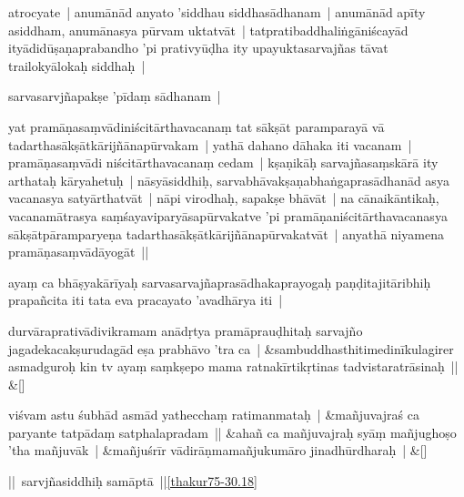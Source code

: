 \documentclass[article,12pt,a4paper]{memoir}%
\newcounter{parCount}
\begin{document}
	  \pstart \leavevmode%
	\label{thakur75-31.9}atrocyate | anumānād anyato 'siddhau siddhasādhanam | anumānād apīty asiddham, anumānasya pūrvam uktatvāt | tatpratibaddhaliṅgāniścayād ityādidūṣaṇaprabandho 'pi prativyūḍha ity upayuktasarvajñas tāvat trailokyālokaḥ siddhaḥ | 
	{}
	\pend%
      

	  \pstart \leavevmode%
	sarvasarvjñapakṣe 'pīdaṃ sādhanam | 
	{}
	\pend%
      

	  \pstart \leavevmode%
	yat pramāṇasaṃvādiniścitārthavacanaṃ tat sākṣāt paramparayā vā tadarthasākṣātkārijñānapūrvakam | yathā dahano dāhaka iti vacanam | pramāṇasaṃvādi niścitārthavacanaṃ cedam | kṣaṇikāḥ sarvajñasaṃskārā ity arthataḥ kāryahetuḥ | nāsyāsiddhiḥ, sarvabhāvakṣaṇabhaṅgaprasādhanād asya vacanasya satyārthatvāt | nāpi virodhaḥ, sapakṣe bhāvāt | na cānaikāntikaḥ, vacanamātrasya saṃśayaviparyāsapūrvakatve 'pi pramāṇaniścitārthavacanasya sākṣātpāramparyeṇa tadarthasākṣātkārijñānapūrvakatvāt | anyathā niyamena pramāṇasaṃvādāyogāt || 
	{}
	\pend%
      

	  \pstart \leavevmode%
	\label{thakur75-31.22}ayaṃ ca bhāṣyakārīyaḥ sarvasarvajñaprasādhakaprayogaḥ paṇḍitajitāribhiḥ prapañcita iti tata eva pracayato 'avadhārya iti | 
	{}
	\pend%
      
	    
	    \stanza[\smallbreak]
	  durvāraprativādivikramam anādṛtya pramāprauḍhitaḥ sarvajño jagadekacakṣurudagād eṣa prabhāvo 'tra ca | &sambuddhasthitimedinīkulagirer asmadguroḥ kin tv ayaṃ saṃkṣepo mama ratnakīrtikṛtinas tadvistaratrāsinaḥ || \&[\smallbreak]
	  
	  
	  
	    
	    \stanza[\smallbreak]
	  viśvam astu śubhād asmād yathecchaṃ ratimanmataḥ | &mañjuvajraś ca paryante tatpādaṃ satphalapradam || &ahañ ca mañjuvajraḥ syāṃ mañjughoṣo 'tha mañjuvāk | &mañjuśrīr vādirāṇmamañjukumāro jinadhūrdharaḥ | \&[\smallbreak]
	  
	  
	  

	  \pstart \leavevmode%
	|| sarvjñasiddhiḥ samāptā ||\cref{thakur75-30.18}
	{}
	\pend%
      
\end{document}
